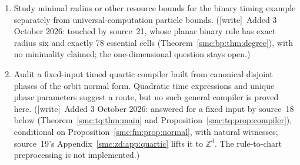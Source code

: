 \documentclass[11pt,letterpaper]{article}
\numberwithin{equation}{section}
\theoremstyle{definition}
\theoremstyle{remark}
\newcommand{\Z}{\mathbb Z}
\newcommand{\wtag}{\textup{[write]}}
\begin{document}
\begin{enumerate}
\item\label{smc:fm:q:radius} Study minimal radius or other resource bounds for the binary timing
example separately from universal-computation particle bounds. (\wtag\ Added 3 October 2026: touched by source~21, whose planar binary rule has exact radius six and exactly 78 essential cells (Theorem~\ref{smc:bp:thm:degree}), with no minimality claimed; the one-dimensional question stays open.)
\item\label{smc:fm:q:quartic} Audit a fixed-input timed quartic compiler built from canonical disjoint
phases of the orbit normal form. Quadratic time expressions and unique phase
parameters suggest a route, but no such general compiler is proved here. (\wtag\ Added 3 October 2026: answered for a fixed input by source~18 below (Theorem~\ref{smc:tq:thm:main} and Proposition~\ref{smc:tq:prop:compiler}), conditional on Proposition~\ref{smc:fm:prop:normal}, with natural witnesses; source~19's Appendix~\ref{smc:zd:app:quartic} lifts it to $\Z^d$. The rule-to-chart preprocessing is not implemented.)
\end{enumerate}
\end{document}
